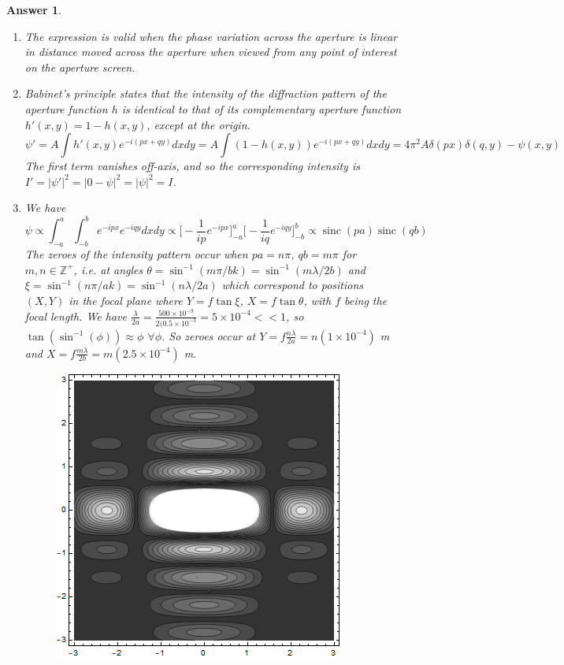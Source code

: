 \documentclass[a4paper]{article}
\DeclareMathOperator{\sinc}{sinc}
\newtheorem{ans}{Answer}[subsection]
\theoremstyle{new}
\begin{document}
\begin{ans}\leavevmode
\begin{enumerate}[label=(\roman*)]
\item The expression is valid when the phase variation across the aperture is linear in distance moved across the aperture when viewed from any point of interest on the aperture screen.
\item Babinet's principle states that the intensity of the diffraction pattern of the aperture function $h$ is identical to that of its complementary aperture function $h'(x,y)=1-h(x,y)$, except at the origin.
$$\psi'=A\int h'(x,y)e^{-i(px+qy)}dxdy=A\int(1-h(x,y))e^{-i(px+qy)}dxdy=4\pi^2A\delta(px)\delta(q,y)-\psi(x,y)$$
The first term vanishes off-axis, and so the corresponding intensity is $I'=|\psi'|^2=|0-\psi|^2=|\psi|^2=I$.
\item We have
$$\psi\propto\int_{-a}^a\int_{-b}^be^{-ipx}e^{-iqy}dxdy\propto\bigg[-\frac{1}{ip}e^{-ipx}\bigg]_{-a}^a\bigg[-\frac{1}{iq}e^{-iqy}\bigg]_{-b}^b\propto\sinc(pa)\sinc(qb)$$
The zeroes of the intensity pattern occur when $pa=n\pi$, $qb=m\pi$ for $m,n\in\mathbb{Z}^+$, i.e. at angles $\theta=\sin^{-1}(m\pi/bk)=\sin^{-1}(m\lambda/2b)$ and $\xi=\sin^{-1}(n\pi/ak)=\sin^{-1}(n\lambda/2a)$ which correspond to positions $(X,Y)$ in the focal plane where $Y=f\tan\xi$, $X=f\tan\theta$, with $f$ being the focal length. We have $\frac{\lambda}{2a}=\frac{500\times10^{-9}}{2(0.5\times10^{-3}}=5\times10^{-4}<<1$, so $\tan(\sin^{-1}(\phi))\approx\phi$ $\forall\phi$. So zeroes occur at $Y=f\frac{n\lambda}{2a}=n(1\times10^{-4})$ m and $X=f\frac{m\lambda}{2b}=m(2.5\times10^{-4})$ m.
\begin{figure}[H]
    \centering
    \includegraphics[scale=0.7]{2016P2B8i.PNG}

\end{figure}
\end{enumerate}
\end{ans}
\end{document}
